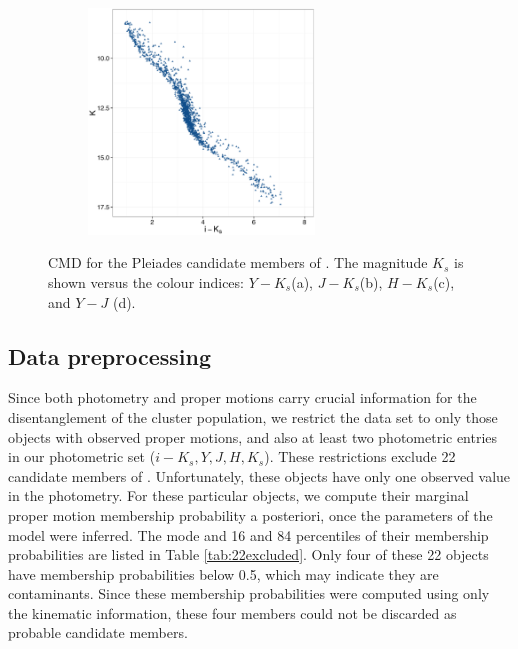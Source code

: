 \begin{figure}[ht!]
\begin{subfigure}[t]{0.45\textwidth}
      \includegraphics[page=5,height=6cm]{background/Figures/CIs.pdf}
        \caption{}
        \label{} 
    \end{subfigure}
    \caption{CMD for the Pleiades candidate members of \citet{Bouy2015}. The magnitude $K_s$ is shown versus the colour indices: $Y-K_s$(a), $J-K_s$(b), $H-K_s$(c), and $Y-J$ (d).}
    \label{fig:otherCI}
\end{figure}


\subsection{Data preprocessing}
Since both photometry and proper motions carry crucial information for the disentanglement of the cluster population, we restrict the data set to only those objects with observed proper motions, and also at least two photometric entries in our photometric set ($i-K_s,Y,J,H,K_s$). These restrictions exclude 22 candidate members of \citet{Bouy2015}. Unfortunately, these objects have only one observed value in the photometry. For these particular objects, we compute their marginal proper motion membership probability a posteriori, once the parameters of the model were inferred. The mode and 16 and 84 percentiles of their membership probabilities are listed in Table \ref{tab:22excluded}. Only four of these 22 objects have membership probabilities below 0.5, which may indicate they are contaminants. Since these membership probabilities were computed using only the kinematic information, these four members could not be discarded as probable candidate members.

